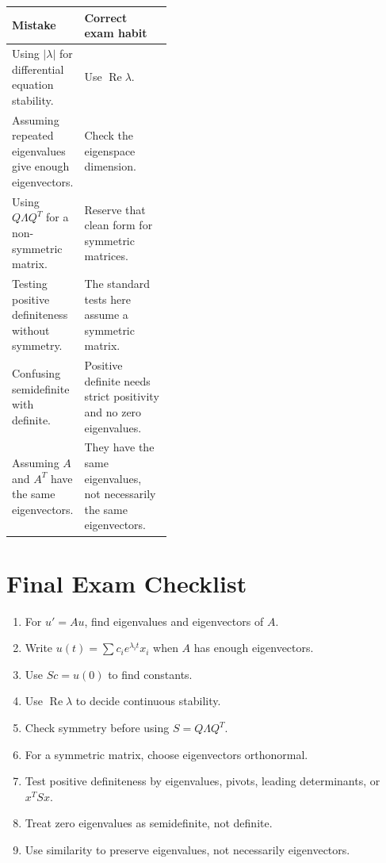 \documentclass[10pt]{article}
\begin{document}
\begin{center}
\small
\begin{tabularx}{\linewidth}{@{}L{0.40\linewidth}Y@{}}
\toprule
Mistake & Correct exam habit \\
\midrule
Using \(|\lambda|\) for differential equation stability. & Use \(\operatorname{Re}\lambda\). \\
Assuming repeated eigenvalues give enough eigenvectors. & Check the eigenspace dimension. \\
Using \(Q\Lambda Q^{T}\) for a non-symmetric matrix. & Reserve that clean form for symmetric matrices. \\
Testing positive definiteness without symmetry. & The standard tests here assume a symmetric matrix. \\
Confusing semidefinite with definite. & Positive definite needs strict positivity and no zero eigenvalues. \\
Assuming \(A\) and \(A^{T}\) have the same eigenvectors. & They have the same eigenvalues, not necessarily the same eigenvectors. \\
\bottomrule
\end{tabularx}
\end{center}

\section{Final Exam Checklist}

\begin{enumerate}
  \item For \(u'=Au\), find eigenvalues and eigenvectors of \(A\).
  \item Write \(u(t)=\sum c_ie^{\lambda_it}x_i\) when \(A\) has enough eigenvectors.
  \item Use \(Sc=u(0)\) to find constants.
  \item Use \(\operatorname{Re}\lambda\) to decide continuous stability.
  \item Check symmetry before using \(S=Q\Lambda Q^{T}\).
  \item For a symmetric matrix, choose eigenvectors orthonormal.
  \item Test positive definiteness by eigenvalues, pivots, leading determinants, or \(x^{T}Sx\).
  \item Treat zero eigenvalues as semidefinite, not definite.
  \item Use similarity to preserve eigenvalues, not necessarily eigenvectors.
\end{enumerate}
\end{document}
